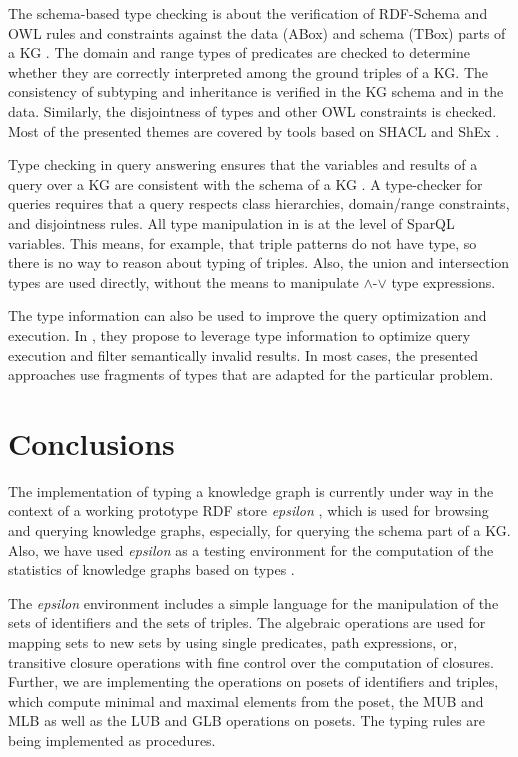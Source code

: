 \documentclass[runningheads]{llncs}
\newcommand{\epsln}{\emph{epsilon} }
\begin{document}
The schema-based type checking is about the verification of RDF-Schema
\cite{rdfschema12} and OWL \cite{owl2} rules and constraints against
the data (ABox) and schema (TBox) parts of a KG
\cite{Baader2002,Horrocks2003,OWL2Spec2012}. The domain and range
types of predicates are checked to determine whether they are correctly interpreted
among the ground triples of a KG. The consistency of subtyping and
inheritance is verified in the KG schema and in the data. Similarly,
the disjointness of types and other OWL constraints is
checked. Most of the presented themes are covered by tools based on
SHACL \cite{shacl2017} and ShEx \cite{shex2015}.

Type checking in query answering ensures that the variables and
results of a query over a KG are consistent with the schema of a KG
\cite{Zhao2017,Zhang2019}. A type-checker for queries requires that a
query respects class hierarchies, domain/range constraints, and
disjointness rules. All type manipulation in \cite{Zhao2017,Zhang2019}
is at the level of SparQL \cite{sparql} variables. This means, for
example, that triple patterns do not have type, so there is no way to
reason about typing of triples. Also, the union and intersection types
are used directly, without the means to manipulate $\land$-$\lor$ type
expressions.

The type information can also be used to improve the query
optimization and execution. In \cite{Kollia2013}, they propose to
leverage type information to optimize query execution and filter
semantically invalid results. In most cases, the presented approaches
use fragments of types that are adapted for the particular problem.





\section{Conclusions\label{sec:conclude}}

The implementation of typing a knowledge graph is currently under way
in the context of a working prototype RDF store \epsln
\cite{epsilon2025}, which is used for browsing and querying knowledge
graphs, especially, for querying the schema part of a KG. Also, we
have used \epsln as a testing environment for the computation of the
statistics of knowledge graphs based on types \cite{Savnik2025}.

The \epsln environment includes a simple language for the manipulation
of the sets of identifiers and the sets of triples. The algebraic
operations are used for mapping sets to new sets by using single
predicates, path expressions, or, transitive closure operations with
fine control over the computation of closures. Further, we are
implementing the operations on posets of identifiers and triples,
which compute minimal and maximal elements from the poset, the MUB and
MLB as well as the LUB and GLB operations on posets. The typing
rules are being implemented as procedures.
\end{document}
